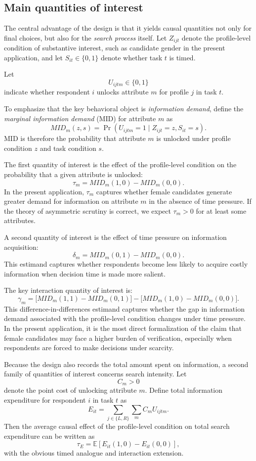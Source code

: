 \documentclass[11pt]{article}
\begin{document}
\subsection*{Main quantities of interest}

The central advantage of the design is that it yields causal quantities not only for final choices, but also for the \emph{search process} itself. Let $Z_{ijt}$ denote the profile-level condition of substantive interest, such as candidate gender in the present application, and let $S_{it} \in \{0,1\}$ denote whether task $t$ is timed.

Let
\[
U_{ijtm} \in \{0,1\}
\]
indicate whether respondent $i$ unlocks attribute $m$ for profile $j$ in task $t$.

To emphasize that the key behavioral object is \emph{information demand}, define the \emph{marginal information demand} (MID) for attribute $m$ as
\[
MID_m(z,s) = \Pr(U_{ijtm}=1 \mid Z_{ijt}=z, S_{it}=s).
\]
MID is therefore the probability that attribute $m$ is unlocked under profile condition $z$ and task condition $s$.

The first quantity of interest is the effect of the profile-level condition on the probability that a given attribute is unlocked:
\[
\tau_m = MID_m(1,0) - MID_m(0,0).
\]
In the present application, $\tau_m$ captures whether female candidates generate greater demand for information on attribute $m$ in the absence of time pressure. If the theory of asymmetric scrutiny is correct, we expect $\tau_m > 0$ for at least some attributes.

A second quantity of interest is the effect of time pressure on information acquisition:
\[
\delta_m = MID_m(0,1) - MID_m(0,0).
\]
This estimand captures whether respondents become less likely to acquire costly information when decision time is made more salient.

The key interaction quantity of interest is:
\[
\gamma_m =
\bigl[MID_m(1,1)-MID_m(0,1)\bigr]
-
\bigl[MID_m(1,0)-MID_m(0,0)\bigr].
\]
This difference-in-differences estimand captures whether the gap in information demand associated with the profile-level condition changes under time pressure. In the present application, it is the most direct formalization of the claim that female candidates may face a higher burden of verification, especially when respondents are forced to make decisions under scarcity.

Because the design also records the total amount spent on information, a second family of quantities of interest concerns search intensity. Let
\[
C_m > 0
\]
denote the point cost of unlocking attribute $m$. Define total information expenditure for respondent $i$ in task $t$ as
\[
E_{it}
=
\sum_{j \in \{L,R\}} \sum_m C_m U_{ijtm}.
\]
Then the average causal effect of the profile-level condition on total search expenditure can be written as
\[
\tau_E
=
\mathbb{E}\!\left[E_{it}(1,0) - E_{it}(0,0)\right],
\]
with the obvious timed analogue and interaction extension.
\end{document}
